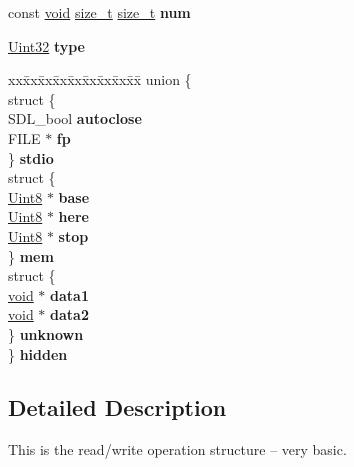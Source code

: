 \begin{DoxyCompactItemize}
\item 
\hypertarget{struct_s_d_l___r_wops_a630921d5c84cf48a4a10f9a75e1caa10}{}const \hyperlink{_s_d_l__audio_8h_a52835ae37c4bb905b903cbaf5d04b05f}{void} \hyperlink{struct_s_d_l___r_wops_acd9a3c6e840d285c1e30cadaf99097b2}{size\+\_\+t} \hyperlink{struct_s_d_l___r_wops_acd9a3c6e840d285c1e30cadaf99097b2}{size\+\_\+t} {\bfseries num}\label{struct_s_d_l___r_wops_a630921d5c84cf48a4a10f9a75e1caa10}

\item 
\hypertarget{struct_s_d_l___r_wops_a099017bfceaac24ced0e4d08a4e0a023}{}\hyperlink{_s_d_l__stdinc_8h_add440eff171ea5f55cb00c4a9ab8672d}{Uint32} {\bfseries type}\label{struct_s_d_l___r_wops_a099017bfceaac24ced0e4d08a4e0a023}

\item 
\hypertarget{struct_s_d_l___r_wops_a282e9150d26585bdf1590726190e62f3}{}\begin{tabbing}
xx\=xx\=xx\=xx\=xx\=xx\=xx\=xx\=xx\=\kill
union \{\\
\>struct \{\\
\>\>SDL\_bool {\bfseries autoclose}\\
\>\>FILE $\ast$ {\bfseries fp}\\
\>\} {\bfseries stdio}\\
\>struct \{\\
\>\>\hyperlink{_s_d_l__stdinc_8h_a2944638813a090aa23e62f4da842c3e2}{Uint8} $\ast$ {\bfseries base}\\
\>\>\hyperlink{_s_d_l__stdinc_8h_a2944638813a090aa23e62f4da842c3e2}{Uint8} $\ast$ {\bfseries here}\\
\>\>\hyperlink{_s_d_l__stdinc_8h_a2944638813a090aa23e62f4da842c3e2}{Uint8} $\ast$ {\bfseries stop}\\
\>\} {\bfseries mem}\\
\>struct \{\\
\>\>\hyperlink{_s_d_l__audio_8h_a52835ae37c4bb905b903cbaf5d04b05f}{void} $\ast$ {\bfseries data1}\\
\>\>\hyperlink{_s_d_l__audio_8h_a52835ae37c4bb905b903cbaf5d04b05f}{void} $\ast$ {\bfseries data2}\\
\>\} {\bfseries unknown}\\
\} {\bfseries hidden}\label{struct_s_d_l___r_wops_a282e9150d26585bdf1590726190e62f3}
\\

\end{tabbing}\end{DoxyCompactItemize}


\subsection{Detailed Description}
This is the read/write operation structure -- very basic. 

